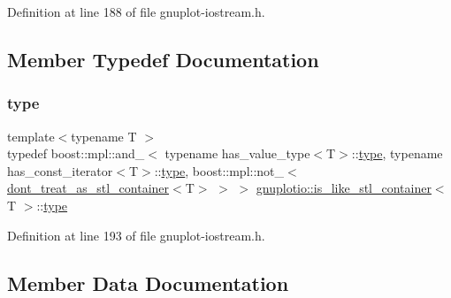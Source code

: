 Definition at line 188 of file gnuplot-\/iostream.\+h.



\subsection{Member Typedef Documentation}
\mbox{\label{structgnuplotio_1_1is__like__stl__container_a050ecfa55e896a27f86d901334f47c6a}} 
\subsubsection{\texorpdfstring{type}{type}}
{\footnotesize\ttfamily template$<$typename T $>$ \\
typedef boost\+::mpl\+::and\+\_\+$<$ typename has\+\_\+value\+\_\+type$<$T$>$\+::\hyperlink{structgnuplotio_1_1is__like__stl__container_a050ecfa55e896a27f86d901334f47c6a}{type}, typename has\+\_\+const\+\_\+iterator$<$T$>$\+::\hyperlink{structgnuplotio_1_1is__like__stl__container_a050ecfa55e896a27f86d901334f47c6a}{type}, boost\+::mpl\+::not\+\_\+$<$\hyperlink{structgnuplotio_1_1dont__treat__as__stl__container}{dont\+\_\+treat\+\_\+as\+\_\+stl\+\_\+container}$<$T$>$ $>$ $>$ \hyperlink{structgnuplotio_1_1is__like__stl__container}{gnuplotio\+::is\+\_\+like\+\_\+stl\+\_\+container}$<$ T $>$\+::\hyperlink{structgnuplotio_1_1is__like__stl__container_a050ecfa55e896a27f86d901334f47c6a}{type}}



Definition at line 193 of file gnuplot-\/iostream.\+h.



\subsection{Member Data Documentation}
\mbox{\label{structgnuplotio_1_1is__like__stl__container_ae4761e6e807deed732e41118c785c8a4}} 

